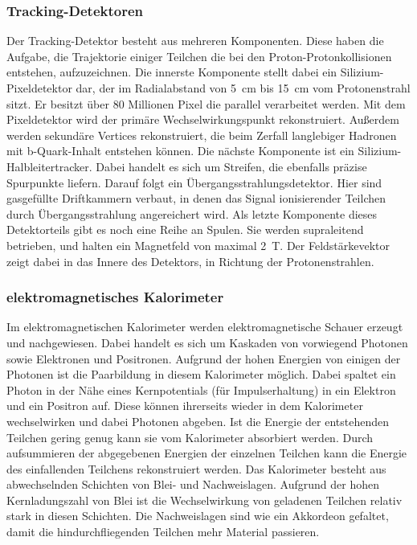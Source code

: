 \subsubsection{Tracking-Detektoren}
Der Tracking-Detektor besteht aus mehreren Komponenten.
Diese haben die Aufgabe, die Trajektorie einiger Teilchen die bei den Proton-Protonkollisionen entstehen, aufzuzeichnen.
Die innerste Komponente stellt dabei ein Silizium-Pixeldetektor dar, der im Radialabstand von \SI{5}{\centi\meter} bis \SI{15}{\centi\meter} vom Protonenstrahl sitzt.
Er besitzt über 80 Millionen Pixel die parallel verarbeitet werden.
Mit dem Pixeldetektor wird der primäre Wechselwirkungspunkt rekonstruiert.
Außerdem werden sekundäre Vertices rekonstruiert, die beim Zerfall langlebiger Hadronen mit b-Quark-Inhalt entstehen können.
Die nächste Komponente ist ein Silizium-Halbleitertracker.
Dabei handelt es sich um Streifen, die ebenfalls präzise Spurpunkte liefern.
Darauf folgt ein Übergangsstrahlungsdetektor.
Hier sind gasgefüllte Driftkammern verbaut, in denen das Signal ionisierender Teilchen durch Übergangsstrahlung angereichert wird.
Als letzte Komponente dieses Detektorteils gibt es noch eine Reihe an Spulen.
Sie werden supraleitend betrieben, und halten ein Magnetfeld von maximal \SI{2}{\tesla}.
Der Feldstärkevektor zeigt dabei in das Innere des Detektors, in Richtung der Protonenstrahlen.

\subsubsection{elektromagnetisches Kalorimeter}
Im elektromagnetischen Kalorimeter werden elektromagnetische Schauer erzeugt und nachgewiesen.
Dabei handelt es sich um Kaskaden von vorwiegend Photonen sowie Elektronen und Positronen.
Aufgrund der hohen Energien von einigen der Photonen ist die Paarbildung in diesem Kalorimeter möglich.
Dabei spaltet ein Photon in der Nähe eines Kernpotentials (für Impulserhaltung) in ein Elektron und ein Positron auf.
Diese können ihrerseits wieder in dem Kalorimeter wechselwirken und dabei Photonen abgeben.
Ist die Energie der entstehenden Teilchen gering genug kann sie vom Kalorimeter absorbiert werden.
Durch aufsummieren der abgegebenen Energien der einzelnen Teilchen kann die Energie des einfallenden Teilchens rekonstruiert werden.
Das Kalorimeter besteht aus abwechselnden Schichten von Blei- und Nachweislagen.
Aufgrund der hohen Kernladungszahl von Blei ist die Wechselwirkung von geladenen Teilchen relativ stark in diesen Schichten.
Die Nachweislagen sind wie ein Akkordeon gefaltet, damit die hindurchfliegenden Teilchen mehr Material passieren.

